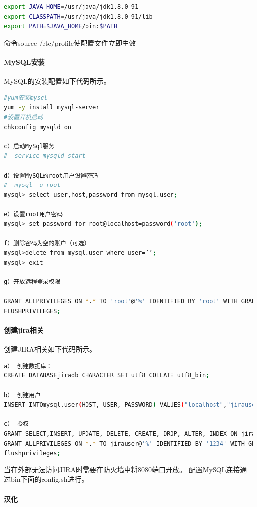 \documentclass{book}
\begin{document}
\begin{lstlisting}[language=Bash]
export JAVA_HOME=/usr/java/jdk1.8.0_91
export CLASSPATH=/usr/java/jdk1.8.0_91/lib
export PATH=$JAVA_HOME/bin:$PATH
\end{lstlisting}

命令source /etc/profile使配置文件立即生效

\paragraph{MySQL安装}MySQL的安装配置如下代码所示。

\begin{lstlisting}[language=Bash]
#yum安装mysql
yum -y install mysql-server
#设置开机启动
chkconfig mysqld on

c）启动MySql服务
#  service mysqld start

d）设置MySQL的root用户设置密码
#  mysql -u root
mysql> select user,host,password from mysql.user;

e）设置root用户密码
mysql> set password for root@localhost=password('root');

f）删除密码为空的账户（可选）
mysql>delete from mysql.user where user=’’;
mysql> exit

g）开放远程登录权限

GRANT ALLPRIVILEGES ON *.* TO 'root'@'%' IDENTIFIED BY 'root' WITH GRANT OPTION;
FLUSHPRIVILEGES;
\end{lstlisting}

\paragraph{创建jira相关}创建JIRA相关如下代码所示。

\begin{lstlisting}[language=Bash]
a） 创建数据库：
CREATE DATABASEjiradb CHARACTER SET utf8 COLLATE utf8_bin;

b） 创建用户
INSERT INTOmysql.user(HOST, USER, PASSWORD) VALUES("localhost","jirauser", PASSWORD("1234"));

c） 授权
GRANT SELECT,INSERT, UPDATE, DELETE, CREATE, DROP, ALTER, INDEX ON jiradb.* TO'jirauser'@'localhost' IDENTIFIED BY '1234';
GRANT ALLPRIVILEGES ON *.* TO jirauser@'%' IDENTIFIED BY '1234' WITH GRANT OPTION;
flushprivileges;
\end{lstlisting}

当在外部无法访问JIRA时需要在防火墙中将8080端口开放。
配置MySQL连接通过bin下面的config.sh进行。


\paragraph{汉化}
\end{document}
